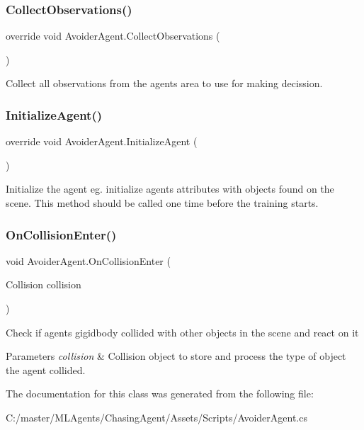 \subsubsection{\texorpdfstring{CollectObservations()}{CollectObservations()}}
{\footnotesize\ttfamily override void Avoider\+Agent.\+Collect\+Observations (\begin{DoxyParamCaption}{ }\end{DoxyParamCaption})}



Collect all observations from the agents area to use for making decission. 

\mbox{\label{class_avoider_agent_a4a4fce491018ac1d6ae86e7f73e86e14}} 
\subsubsection{\texorpdfstring{InitializeAgent()}{InitializeAgent()}}
{\footnotesize\ttfamily override void Avoider\+Agent.\+Initialize\+Agent (\begin{DoxyParamCaption}{ }\end{DoxyParamCaption})}



Initialize the agent eg. initialize agents attributes with objects found on the scene. This method should be called one time before the training starts. 

\mbox{\label{class_avoider_agent_a6f48bb4acf941004e6c18052277ee8b2}} 
\subsubsection{\texorpdfstring{OnCollisionEnter()}{OnCollisionEnter()}}
{\footnotesize\ttfamily void Avoider\+Agent.\+On\+Collision\+Enter (\begin{DoxyParamCaption}\item[{Collision}]{collision }\end{DoxyParamCaption})\hspace{0.3cm}{\ttfamily [private]}}



Check if agents gigidbody collided with other objects in the scene and react on it 


\begin{DoxyParams}{Parameters}
{\em collision} & Collision object to store and process the type of object the agent collided.\\
\hline
\end{DoxyParams}


The documentation for this class was generated from the following file\+:\begin{DoxyCompactItemize}
\item 
C\+:/master/\+M\+L\+Agents/\+Chasing\+Agent/\+Assets/\+Scripts/Avoider\+Agent.\+cs\end{DoxyCompactItemize}
